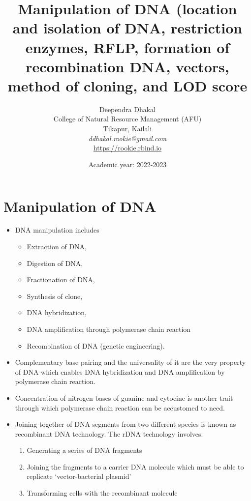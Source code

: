 \documentclass[11pt,dvipsnames,ignorenonframetext,aspectratio=169]{beamer}
\title[]{Manipulation of DNA (location and isolation of DNA,
restriction enzymes, RFLP, formation of recombination DNA, vectors,
method of cloning, and LOD score}
\author[
        Deependra Dhakal\\
College of Natural Resource Management (AFU)\\
Tikapur, Kailali\\
\textit{ddhakal.rookie@gmail.com}\\
\url{https://rookie.rbind.io}
    ]{Deependra Dhakal\\
College of Natural Resource Management (AFU)\\
Tikapur, Kailali\\
\textit{ddhakal.rookie@gmail.com}\\
\url{https://rookie.rbind.io}}
\date[
      Academic year: 2022-2023
  ]{
      Academic year: 2022-2023
        }
\providecommand{\tightlist}{%
  \setlength{\itemsep}{0pt}\setlength{\parskip}{0pt}}
\begin{document}
  \begin{frame}[plain]
  \titlepage
  \end{frame}



\hypertarget{manipulation-of-dna}{%
\section{Manipulation of DNA}\label{manipulation-of-dna}}

\begin{frame}{}
\protect\hypertarget{section}{}
\begin{itemize}
\tightlist
\item
  DNA manipulation includes

  \begin{itemize}
  \tightlist
  \item
    Extraction of DNA,
  \item
    Digestion of DNA,
  \item
    Fractionation of DNA,
  \item
    Synthesis of clone,
  \item
    DNA hybridization,
  \item
    DNA amplification through polymerase chain reaction
  \item
    Recombination of DNA (genetic engineering).
  \end{itemize}
\end{itemize}
\end{frame}

\begin{frame}{}
\protect\hypertarget{section-1}{}
\begin{itemize}
\tightlist
\item
  Complementary base pairing and the universality of it are the very
  property of DNA which enables DNA hybridization and DNA amplification
  by polymerase chain reaction.
\item
  Concentration of nitrogen bases of guanine and cytocine is another
  trait through which polymerase chain reaction can be accustomed to
  need.
\item
  Joining together of DNA segments from two different species is known
  as recombinant DNA technology. The rDNA technology involves:

  \begin{enumerate}
  \tightlist
  \item
    Generating a series of DNA fragments
  \item
    Joining the fragments to a carrier DNA molecule which must be able
    to replicate `vector-bacterial plasmid'
  \item
    Transforming cells with the recombinant molecule
  \end{enumerate}
\end{itemize}
\end{frame}
\end{document}

